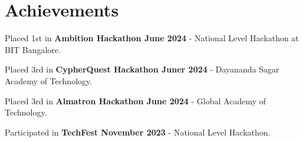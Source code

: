 \documentclass[a4paper,11pt]{article}
\begin{document}
\section{Achievements}
\begin{description}[font=$\bullet$]
\item {Placed 1st in \textbf{Ambition Hackathon June 2024} - National Level Hackathon at BIT Bangalore.}
\vspace{-5pt}
\item {Placed 3rd in \textbf{CypherQuest Hackathon Juner 2024} - Dayananda Sagar Academy of Technology.}
\vspace{-5pt}
\item {Placed 3rd in \textbf{Almatron Hackathon June 2024} - Global Academy of Technology.}
\vspace{-5pt}
\item {Participated in \textbf{TechFest November 2023} - National Level Hackathon.}
\end{description}






\vspace{-5pt}
\end{document}
